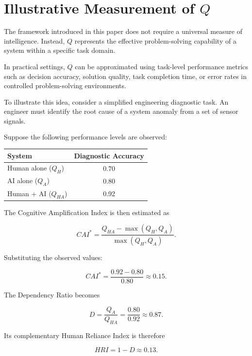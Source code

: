 \documentclass[11pt]{article}
\begin{document}
\section{Illustrative Measurement of $Q$}

The framework introduced in this paper does not require a universal
measure of intelligence. Instead, $Q$ represents the effective
problem-solving capability of a system within a specific task domain.

In practical settings, $Q$ can be approximated using task-level
performance metrics such as decision accuracy, solution quality,
task completion time, or error rates in controlled problem-solving
environments.

To illustrate this idea, consider a simplified engineering diagnostic
task. An engineer must identify the root cause of a system anomaly
from a set of sensor signals.

Suppose the following performance levels are observed:

\begin{center}
\begin{tabular}{lc}
\toprule
System & Diagnostic Accuracy \\
\midrule
Human alone ($Q_H$) & 0.70 \\
AI alone ($Q_A$) & 0.80 \\
Human + AI ($Q_{HA}$) & 0.92 \\
\bottomrule
\end{tabular}
\end{center}

The Cognitive Amplification Index is then estimated as

\begin{equation}
CAI^* = \frac{Q_{HA} - \max(Q_H, Q_A)}{\max(Q_H, Q_A)}.
\end{equation}

Substituting the observed values:

\begin{equation}
CAI^* = \frac{0.92 - 0.80}{0.80} \approx 0.15.
\end{equation}

The Dependency Ratio becomes

\begin{equation}
D = \frac{Q_A}{Q_{HA}} = \frac{0.80}{0.92} \approx 0.87.
\end{equation}

Its complementary Human Reliance Index is therefore

\begin{equation}
HRI = 1 - D \approx 0.13.
\end{equation}
\end{document}
